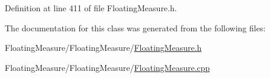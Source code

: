 Definition at line 411 of file Floating\+Measure.\+h.



The documentation for this class was generated from the following files\+:\begin{DoxyCompactItemize}
\item 
Floating\+Measure/\+Floating\+Measure/\hyperlink{FloatingMeasure_8h}{Floating\+Measure.\+h}\item 
Floating\+Measure/\+Floating\+Measure/\hyperlink{FloatingMeasure_8cpp}{Floating\+Measure.\+cpp}\end{DoxyCompactItemize}

